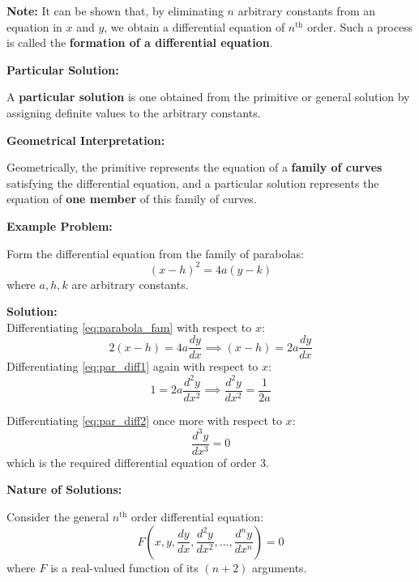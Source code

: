 \documentclass[11pt,a4paper]{article}
\newcommand{\Heading}[1]{\vspace{0.3cm}\noindent\textbf{\textcolor{AcademicGreen}{\large #1}}\par\vspace{0.15cm}}
\begin{document}
\vspace{0.15cm}
\begin{tcolorbox}[greenbox]
    \textbf{\textcolor{AcademicGreen}{Note:}} It can be shown that, by eliminating $n$ arbitrary constants from an equation in $x$ and $y$, we obtain a differential equation of $n^{\text{th}}$ order. Such a process is called the \textbf{formation of a differential equation}.
\end{tcolorbox}

\Heading{Particular Solution:}
A \textbf{particular solution} is one obtained from the primitive or general solution by assigning definite values to the arbitrary constants.

\Heading{Geometrical Interpretation:}
Geometrically, the primitive represents the equation of a \textbf{family of curves} satisfying the differential equation, and a particular solution represents the equation of \textbf{one member} of this family of curves.

\Heading{Example Problem:}
Form the differential equation from the family of parabolas:
\begin{equation}
    (x - h)^2 = 4a(y - k) \label{eq:parabola_fam}
\end{equation}
where $a, h, k$ are arbitrary constants.

\noindent\textbf{Solution:} \\
Differentiating \eqref{eq:parabola_fam} with respect to $x$:
\begin{equation}
    2(x - h) = 4a \frac{dy}{dx} \implies (x - h) = 2a \frac{dy}{dx} \label{eq:par_diff1}
\end{equation}
Differentiating \eqref{eq:par_diff1} again with respect to $x$:
\begin{equation}
    1 = 2a \frac{d^2y}{dx^2} \implies \frac{d^2y}{dx^2} = \frac{1}{2a} \label{eq:par_diff2}
\end{equation}

\noindent Differentiating \eqref{eq:par_diff2} once more with respect to $x$:
\[
\frac{d^3y}{dx^3} = 0
\]
which is the required differential equation of order 3.

\Heading{Nature of Solutions:}
Consider the general $n^{\text{th}}$ order differential equation:
\begin{equation}
    F\left(x, y, \frac{dy}{dx}, \frac{d^2y}{dx^2}, \ldots, \frac{d^ny}{dx^n}\right) = 0 \label{eq:nth_order}
\end{equation}
where $F$ is a real-valued function of its $(n+2)$ arguments.
\end{document}
